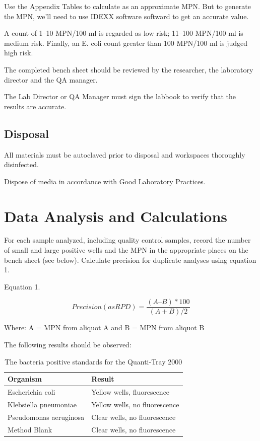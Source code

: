 \documentclass[12pt]{../SOP4_alpha}\usepackage[]{graphicx}\usepackage[]{xcolor}
\begin{document}
\NP Use the Appendix Tables to calculate as an approximate MPN. But to generate the MPN, we'll need to use IDEXX software softward to get an accurate value.

\NP A count of 1--10 MPN/100 ml is regarded as low risk; 11--100 MPN/100 ml is medium risk. Finally, an E. coli count greater than 100 MPN/100 ml is judged high risk.


\NP The completed bench sheet should be reviewed by the researcher, the
laboratory director and the QA manager. 

\NP The Lab Director or QA Manager must sign the labbook to verify that the results are accurate. 

\subsection{Disposal}


\NP All materials must be autoclaved prior to disposal and workspaces
thoroughly disinfected.

\NP Dispose of media in accordance with Good Laboratory Practices.

\section{Data Analysis and Calculations}

\NP For each sample analyzed, including quality control samples, record
the number of small and large positive wells and the MPN in the
appropriate places on the bench sheet (see below). Calculate
precision for duplicate analyses using equation 1.

\NP Equation 1. 

\begin{equation}
Precision (as RPD) = \frac{(A – B)*100}{(A + B)/2}
\end{equation}

Where: A = MPN from aliquot A and
 B = MPN from aliquot B 

\NP The following results should be observed:


\begin{table}
\caption{The bacteria positive standards for the Quanti-Tray 2000}
		\begin{tabular}{ll}\hline

Organism                &  Result \\ \hline \hline
Escherichia coli        & Yellow wells, fluorescence \\
Klebsiella pneumoniae   & Yellow wells, no fluorescence \\
Pseudomonas aeruginosa  & Clear wells, no fluorescence \\
Method Blank            & Clear wells, no fluorescence \\ \hline
  \end{tabular}
\end{table}
\end{document}
